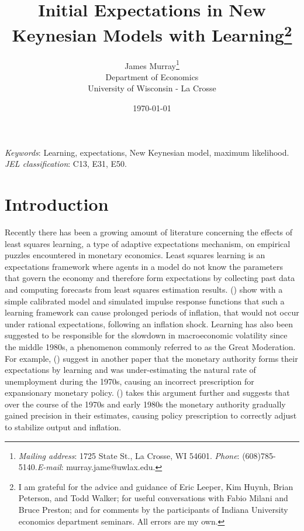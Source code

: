 \documentclass[11pt]{article}
\newcommand{\citee}[1]{\citeauthor*{#1} (\citeyear{#1})}
\begin{document}
\begin{titlepage}
\begin{singlespace}
\title{Initial Expectations in New Keynesian Models with Learning\footnote{I am grateful for the advice and guidance of Eric Leeper, Kim Huynh, Brian Peterson, and Todd Walker; for useful conversations with Fabio Milani and Bruce Preston; and for comments by the participants of Indiana University economics department seminars.  All errors are my own.}}
\date{\today}
\author{
James Murray\footnote{\textit{Mailing address}: 1725 State St., La Crosse, WI  54601. \textit{Phone}: (608)785-5140.\newline  \textit{E-mail}: murray.jame@uwlax.edu.}\\Department of Economics\\University of Wisconsin - La Crosse
}

\maketitle

\thispagestyle{empty}

\abstract{} \newline  

\noindent \textit{Keywords}: Learning, expectations, New Keynesian model, maximum likelihood. \\
\noindent \textit{JEL classification}: C13, E31, E50.
\end{singlespace}
\end{titlepage}
\newpage

\section{Introduction}
Recently there has been a growing amount of literature concerning the effects of least squares learning, a type of adaptive expectations mechanism, on empirical puzzles encountered in monetary economics.  Least squares learning is an expectations framework where agents in a model do not know the parameters that govern the economy and therefore form expectations by collecting past data and computing forecasts from least squares estimation results.  \citee{ow2005} show with a simple calibrated model and simulated impulse response functions that such a learning framework can cause prolonged periods of inflation, that would not occur under rational expectations, following an inflation shock.  Learning has also been suggested to be responsible for the slowdown in macroeconomic volatility since the middle 1980s, a phenomenon commonly referred to as the Great Moderation.  For example, \citee{ow2005b} suggest in another paper that the monetary authority forms their expectations by learning and was under-estimating the natural rate of unemployment during the 1970s, causing an incorrect prescription for expansionary monetary policy.  \citee{primiceri2006} takes this argument further and suggests that over the course of the 1970s and early 1980s the monetary authority gradually gained precision in their estimates, causing policy prescription to correctly adjust to stabilize output and inflation.
\end{document}
